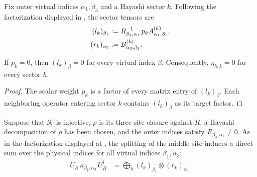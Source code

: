 \begin{definition}
    \label{def:mpdo_sector_tensors}
    \leanok
    Fix outer virtual indices $\alpha_1,\beta_3$ and a Hayashi sector $k$.
    Following the factorization displayed in
    \cite[Appendix~C.2, lines~1435--1448]{Cirac2016MPDO_arXiv}, the sector
    tensors are
    \begin{align}
        (l_k)_{\beta_1}
         & :=R_{\beta_3,\alpha_1}^{-1}\,p_k
        A^{(k)}_{\alpha_1,\beta_1},
        \notag                              \\
        (r_k)_{\alpha_3}
         & :=B^{(k)}_{\alpha_3,\beta_3}.
        \notag
    \end{align}
\end{definition}

\begin{lemma}
    \label{lem:mpdo_sector_tensor_left_zero_of_weight_zero}
    \leanok
    If $p_k=0$, then $(l_k)_\beta=0$ for every virtual index $\beta$.
    Consequently, $\eta_{h,k}=0$ for every sector $h$.
\end{lemma}

\begin{proof}
    \leanok
    The scalar weight $p_k$ is a factor of every matrix entry of
    $(l_k)_\beta$. Each neighboring operator entering sector $k$ contains
    $(l_k)_\beta$ as its target factor.
\end{proof}

\begin{lemma}
    \label{thm:mpdo_sector_factorization}
    \leanok
    Suppose that $\mathcal K$ is injective, $\rho$ is its three-site closure
    against $R$, a Hayashi decomposition of $\rho$ has been chosen, and the
    outer indices satisfy $R_{\beta_3,\alpha_1}\ne0$. As in the factorization
    displayed at \cite[Appendix~C.2, lines~1435--1448]{Cirac2016MPDO_arXiv},
    the splitting of the middle site induces a direct sum over the physical
    indices for all virtual indices $\beta_1,\alpha_3$:
    \begin{align}
        U_B\,\kappa_{\beta_1,\alpha_3}\,U_B^\dagger
         & =\bigoplus_k
        (l_k)_{\beta_1}\otimes(r_k)_{\alpha_3}.
        \label{eq:rfp_sector_factorization}
    \end{align}
\end{lemma}

